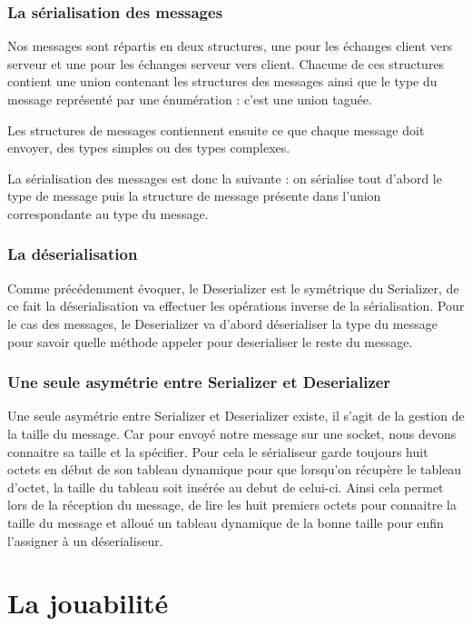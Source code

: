 \documentclass[a4paper, 12pt]{article}
\begin{document}
		\subsubsection{La sérialisation des messages}

		Nos messages sont répartis en deux structures, une pour les échanges client vers serveur et une pour les échanges serveur vers client. Chacune de ces structures contient une union contenant les structures des messages ainsi que le type du message représenté par une énumération : c'est une union taguée.

		Les structures de messages contiennent ensuite ce que chaque message doit envoyer, des types simples ou des types complexes. 
		
		La sérialisation des messages est donc la suivante : on sérialise tout d'abord le type de message puis la structure de message présente dans l'union correspondante au type du message.

		\subsubsection{La déserialisation}

		Comme précédemment évoquer, le Deserializer est le symétrique du Serializer, de ce fait la déserialisation va effectuer les opérations inverse de la sérialisation. Pour le cas des messages, le Deserializer va d'abord déserialiser la type du message pour savoir quelle méthode appeler pour deserialiser le reste du message.

		\subsubsection{Une seule asymétrie entre Serializer et Deserializer}

		Une seule asymétrie entre Serializer et Deserializer existe, il s'agit de la gestion de la taille du message. Car pour envoyé notre message sur une socket, nous devons connaitre sa taille et la spécifier. Pour cela le sérialiseur garde toujours huit octets en début de son tableau dynamique pour que lorsqu'on récupère le tableau d'octet, la taille du tableau soit insérée au debut de celui-ci. Ainsi cela permet lors de la réception du message, de lire les huit premiers octets pour connaitre la taille du message et alloué un tableau dynamique de la bonne taille pour enfin l'assigner à un déserialiseur.

	
	\section{La jouabilité}
\end{document}
